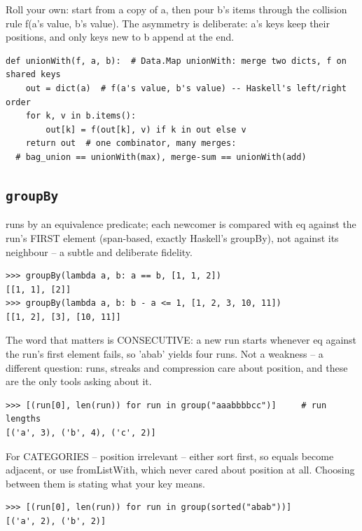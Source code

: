 \documentclass[10pt,letterpaper]{book}
\begin{document}
Roll your own: start from a copy of a, then pour b's items through the collision rule f(a's value, b's value). The asymmetry is deliberate: a's keys keep their positions, and only keys new to b append at the end.

\begin{lstlisting}[style=ex]
def unionWith(f, a, b):  # Data.Map unionWith: merge two dicts, f on shared keys
    out = dict(a)  # f(a's value, b's value) -- Haskell's left/right order
    for k, v in b.items():
        out[k] = f(out[k], v) if k in out else v
    return out  # one combinator, many merges:
  # bag_union == unionWith(max), merge-sum == unionWith(add)
\end{lstlisting}

\subsection{\texttt{groupBy}}\label{def:groupBy}
runs by an equivalence predicate; each newcomer is compared with eq against the run's FIRST element (span-based, exactly Haskell's groupBy), not against its neighbour -- a subtle and deliberate fidelity.
\begin{lstlisting}[style=ex]
>>> groupBy(lambda a, b: a == b, [1, 1, 2])
[[1, 1], [2]]
>>> groupBy(lambda a, b: b - a <= 1, [1, 2, 3, 10, 11])
[[1, 2], [3], [10, 11]]
\end{lstlisting}

The word that matters is CONSECUTIVE: a new run starts whenever eq against the run's first element fails, so 'abab' yields four runs. Not a weakness -- a different question: runs, streaks and compression care about position, and these are the only tools asking about it.

\begin{lstlisting}[style=ex]
>>> [(run[0], len(run)) for run in group("aaabbbbcc")]     # run lengths
[('a', 3), ('b', 4), ('c', 2)]
\end{lstlisting}

For CATEGORIES -- position irrelevant -- either sort first, so equals become adjacent, or use fromListWith, which never cared about position at all. Choosing between them is stating what your key means.

\begin{lstlisting}[style=ex]
>>> [(run[0], len(run)) for run in group(sorted("abab"))]
[('a', 2), ('b', 2)]
\end{lstlisting}
\end{document}
